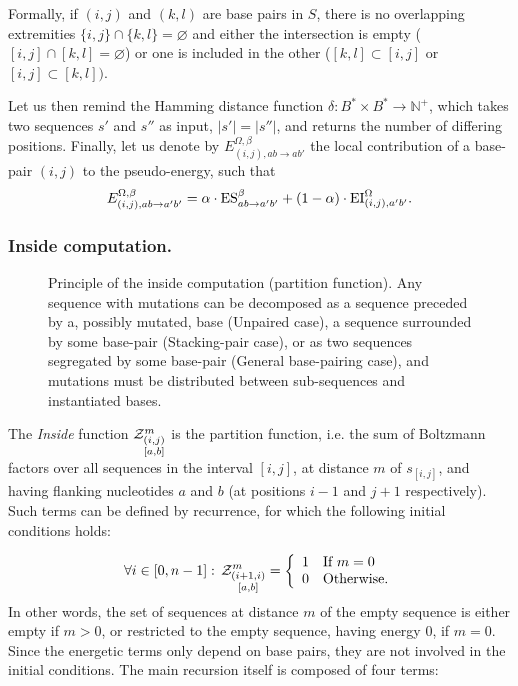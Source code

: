 Formally, if $(i,j)$ and $(k,l)$ are base pairs in $S$, there is no overlapping extremities
 $\{i,j\}\cap \{k,l\}=\varnothing$ and either the intersection is empty 
 ($[i,j]\cap[k,l]=\varnothing$) or one is included in the other ($[k,l]\subset[i,j]$ or 
 $[i,j]\subset[k,l])$. 


Let us then remind the Hamming distance function $\delta: B^*\times B^* \to \mathbb{N}^+$, which takes two sequences $s'$ and $s''$ as input, $|s'|=|s''|$, and returns the number of differing positions.
Finally, let us denote by $E_{(i,j),ab \to ab'}^{\Omega,\beta}$ the local contribution of a base-pair $(i,j)$ to the pseudo-energy, such that
\begin{equation}
  E_{(i,j),ab \to a'b'}^{\Omega,\beta}  = \alpha \cdot\text{ES}^\beta_{a b \to a' b'}+(1-\alpha)\cdot\text{EI}^{\Omega}_{(i,j),a'b'}.
\end{equation}
\subsubsection{Inside computation.}
\begin{figure}[t]
\begin{minipage}{0.60\textwidth}
\resizebox{\textwidth}{!}{}
\end{minipage}
\begin{minipage}{0.38\textwidth}
\caption{Principle of the inside computation (partition function). Any sequence with mutations  
can be decomposed as a sequence preceded by a, possibly mutated, base 
(Unpaired case), a sequence surrounded by some base-pair (Stacking-pair case), 
or as two sequences segregated by some base-pair (General base-pairing case), and mutations must be distributed between sub-sequences 
and instantiated bases.}
\end{minipage}
\SpaceCheating
\end{figure}

The \emph{Inside} function $\Z{i,j}{m}{a,b}$ is the partition function, i.e. the sum of Boltzmann factors over all sequences in the interval $[i,j]$, at distance $m$ of $s_{[i,j]}$, and having flanking nucleotides $a$ and $b$ (at positions $i-1$ and $j+1$ respectively). 
Such terms can be defined by recurrence, for which the following initial conditions holds:

\begin{equation}
	\forall i \in [0,n-1]:\, \Z{i+1,i}{m}{a,b}=\left\{
	\begin{array}{ll}
		1 &\text{If } m = 0\\
		0 &\text{Otherwise.}
	\end{array}\right.
\label{eq:Z_in}
\end{equation}
In other words, the set of sequences at distance $m$ of the empty sequence is either empty if $m>0$, or restricted to the empty sequence, having energy $0$, if $m=0$. Since the energetic terms only depend on base pairs, they are not involved in the initial conditions. 
The main recursion itself is composed of four terms:\\

